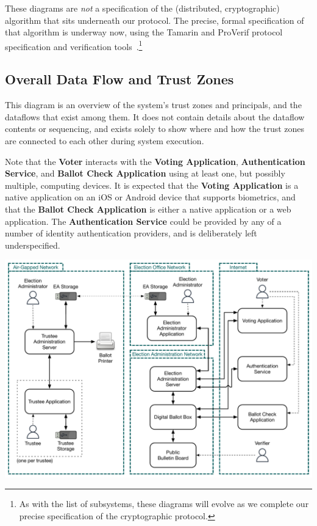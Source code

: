 \documentclass[10pt,letterpaper]{article}
\begin{document}
These diagrams are \emph{not} a specification of the (distributed, cryptographic) algorithm that sits underneath our protocol. The precise, formal specification of that algorithm is underway now, using the Tamarin and ProVerif protocol specification and verification tools~\cite{ChevalSAPICprotocolverifiers2022,MeierTAMARINProverSymbolic2013,BlanchetModelingVerifyingSecurity2016}.\footnote{As with the list of subsystems, these diagrams will evolve as we complete our precise specification of the cryptographic protocol.}

\subsection{Overall Data Flow and Trust Zones}

This diagram is an overview of the system's trust zones and principals, and the dataflows that exist among them. It does not contain details about the dataflow contents or sequencing, and exists solely to show where and how the trust zones are connected to each other during system execution.

Note that the \textbf{Voter} interacts with the \textbf{Voting Application}, \textbf{Authentication Service}, and \textbf{Ballot Check Application} using at least one, but possibly multiple, computing devices. It is expected that the \textbf{Voting Application} is a native application on an iOS or Android device that supports biometrics, and that the \textbf{Ballot Check Application} is either a native application or a web application. The \textbf{Authentication Service} could be provided by any of a number of identity authentication providers, and is deliberately left underspecified.

\includegraphics[width=\textwidth]{diagrams/system-overview.pdf}
\end{document}
